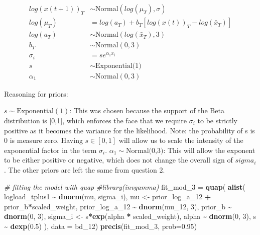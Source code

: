 \documentclass[
]{article}
\newenvironment{Shaded}{\begin{snugshade}}{\end{snugshade}}
\newcommand{\AttributeTok}[1]{\textcolor[rgb]{0.13,0.29,0.53}{#1}}
\newcommand{\CommentTok}[1]{\textcolor[rgb]{0.56,0.35,0.01}{\textit{#1}}}
\newcommand{\DecValTok}[1]{\textcolor[rgb]{0.00,0.00,0.81}{#1}}
\newcommand{\FloatTok}[1]{\textcolor[rgb]{0.00,0.00,0.81}{#1}}
\newcommand{\FunctionTok}[1]{\textcolor[rgb]{0.13,0.29,0.53}{\textbf{#1}}}
\newcommand{\NormalTok}[1]{#1}
\newcommand{\OtherTok}[1]{\textcolor[rgb]{0.56,0.35,0.01}{#1}}
\newcommand{\SpecialCharTok}[1]{\textcolor[rgb]{0.81,0.36,0.00}{\textbf{#1}}}
\begin{document}
\[
\begin{aligned}
log(x(t+1))_T &\sim \text{Normal}(log(\mu_T), \sigma) \\
log(\mu_T) &= log(a_{T}) + b_{T} [log(x(t))_T - log(\bar{x}_T)] \\
log(a_{T}) &\sim \text{Normal}(log(\bar{x}_T), 3) \\
b_{T} &\sim \text{Normal}(0, 3) \\
\sigma_i &= s e^{\alpha_1 x_i} \\
s &\sim \text{Exponential(1)} \\
\alpha_1 &\sim \text{Normal}(0, 3)
\end{aligned}
\]

Reasoning for priors:

\(s \sim \text{Exponential}(1)\): This was chosen because the support of
the Beta distribution is {[}0,1{]}, which enforces the face that we
require \(\sigma_i\) to be strictly positive as it becomes the variance
for the likelihood. Note: the probability of s is 0 is measure zero.
Having \(s \in [0,1]\) will allow us to scale the intensity of the
exponential factor in the term \(\sigma_i\).
\(\alpha_1 \sim \text{Normal(0,3)}\): This will allow the exponent to be
either positive or negative, which does not change the overall sign of
\(sigma_i\). The other priors are left the same from question 2.

\begin{Shaded}
\begin{Highlighting}[]
\CommentTok{\# fitting the model with \textquotesingle{}quap\textquotesingle{} }
\CommentTok{\#library(invgamma)}
\NormalTok{fit\_mod\_3 }\OtherTok{=} \FunctionTok{quap}\NormalTok{(}
             \FunctionTok{alist}\NormalTok{(}
\NormalTok{                logload\_tplus1 }\SpecialCharTok{\textasciitilde{}} \FunctionTok{dnorm}\NormalTok{(mu, sigma\_i),}
\NormalTok{                mu }\OtherTok{\textless{}{-}}\NormalTok{ prior\_log\_a\_12 }\SpecialCharTok{+}\NormalTok{ prior\_b}\SpecialCharTok{*}\NormalTok{scaled\_weight,}
\NormalTok{                prior\_log\_a\_12 }\SpecialCharTok{\textasciitilde{}} \FunctionTok{dnorm}\NormalTok{(mu\_12, }\DecValTok{3}\NormalTok{),}
\NormalTok{                prior\_b }\SpecialCharTok{\textasciitilde{}} \FunctionTok{dnorm}\NormalTok{(}\DecValTok{0}\NormalTok{, }\DecValTok{3}\NormalTok{),}
\NormalTok{                sigma\_i }\OtherTok{\textless{}{-}}\NormalTok{ s}\SpecialCharTok{*}\FunctionTok{exp}\NormalTok{(alpha }\SpecialCharTok{*}\NormalTok{ scaled\_weight), }
\NormalTok{                alpha }\SpecialCharTok{\textasciitilde{}} \FunctionTok{dnorm}\NormalTok{(}\DecValTok{0}\NormalTok{, }\DecValTok{3}\NormalTok{),}
\NormalTok{                s }\SpecialCharTok{\textasciitilde{}} \FunctionTok{dexp}\NormalTok{(}\FloatTok{0.5}\NormalTok{)}
\NormalTok{             ), }\AttributeTok{data =}\NormalTok{ bd\_12)}
\FunctionTok{precis}\NormalTok{(fit\_mod\_3, }\AttributeTok{prob=}\FloatTok{0.95}\NormalTok{)}
\end{Highlighting}
\end{Shaded}
\end{document}
